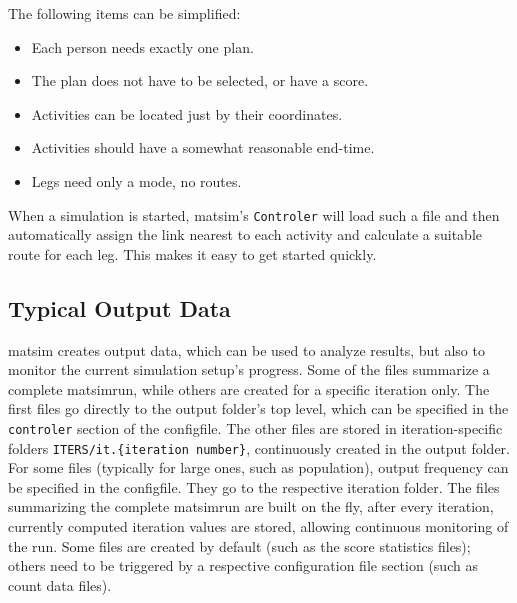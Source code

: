 The following items can be simplified:
\begin{itemize}\styleItemize
\item Each person needs exactly one plan.
\item The plan does not have to be selected, or have a score.
\item Activities can be located just by their coordinates.
\item Activities should have a somewhat reasonable end-time.
\item Legs need only a mode, no routes.
\end{itemize}
When a simulation is started, \gls{matsim}'s \lstinline|Controler| will load such a file and then automatically assign the link nearest to each activity and calculate a suitable route for each leg. This makes it easy to get started quickly. 

\subsection{Typical Output Data}
\label{sec:outputdata}
\gls{matsim} creates
output data, which can be used to analyze results, but also to monitor the current simulation setup's progress. Some of the files summarize a complete \gls{matsimrun}, while others are created for a specific \gls{iteration} only. The first files go directly to the output folder's top level, which can be specified in the \lstinline|controler| section of the \gls{configfile}. The other files are stored in iteration-specific folders \lstinline|ITERS/it.{iteration number}|, continuously created in the output folder. For some files (typically for  large ones, such as population), output frequency can be specified in the \gls{configfile}. They go to the respective iteration folder. The files summarizing the complete \gls{matsimrun} are built on the fly, \ie after every iteration, currently computed iteration values are stored, allowing continuous monitoring of the run. Some files are created by default (such as the score statistics files); others need to be triggered by a respective configuration file section (such as count data files).


